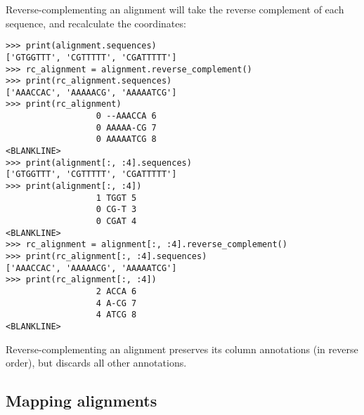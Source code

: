 Reverse-complementing an alignment will take the reverse complement of each sequence, and recalculate the coordinates:
\begin{verbatim}
>>> print(alignment.sequences)
['GTGGTTT', 'CGTTTTT', 'CGATTTTT']
>>> rc_alignment = alignment.reverse_complement()
>>> print(rc_alignment.sequences)
['AAACCAC', 'AAAAACG', 'AAAAATCG']
>>> print(rc_alignment)
                  0 --AAACCA 6
                  0 AAAAA-CG 7
                  0 AAAAATCG 8
<BLANKLINE>
>>> print(alignment[:, :4].sequences)
['GTGGTTT', 'CGTTTTT', 'CGATTTTT']
>>> print(alignment[:, :4])
                  1 TGGT 5
                  0 CG-T 3
                  0 CGAT 4
<BLANKLINE>
>>> rc_alignment = alignment[:, :4].reverse_complement()
>>> print(rc_alignment[:, :4].sequences)
['AAACCAC', 'AAAAACG', 'AAAAATCG']
>>> print(rc_alignment[:, :4])
                  2 ACCA 6
                  4 A-CG 7
                  4 ATCG 8
<BLANKLINE>
\end{verbatim}
Reverse-complementing an alignment preserves its column annotations (in reverse order), but discards all other annotations.

\subsection{Mapping alignments}

